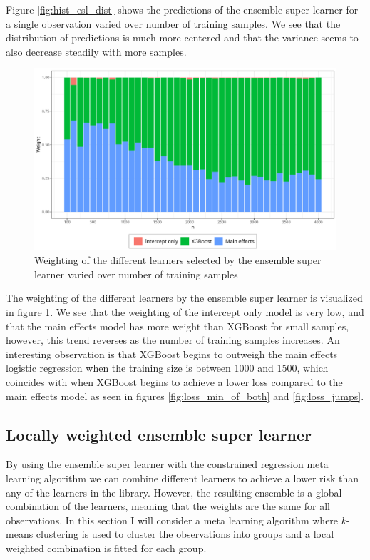 \documentclass[./main.tex]{subfiles}
\begin{document}
Figure \ref{fig:hist_esl_dist} shows the predictions of the ensemble super learner for a single observation varied over number of training samples. We see that the distribution of predictions is much more centered and that the variance seems to also decrease steadily with more samples. 
\begin{figure}[H]
    \centering
    \includegraphics[width=\textwidth]{figures/esl_weights.png}
    \caption{Weighting of the different learners selected by the ensemble super learner varied over number of training samples}
    \label{fig:esl_weights}
\end{figure}
The weighting of the different learners by the ensemble super learner is visualized in figure \ref{fig:esl_weights}. We see that the weighting of the intercept only model is very low, and that the main effects model has more weight than XGBoost for small samples, however, this trend reverses as the number of training samples increases. An interesting observation is that XGBoost begins to outweigh the main effects logistic regression when the training size is between 1000 and 1500, which coincides with when XGBoost begins to achieve a lower loss compared to the main effects model as seen in figures \ref{fig:loss_min_of_both} and \ref{fig:loss_jumps}.

\subsection{Locally weighted ensemble super learner} \label{locally_weighted_ensemble_super_learner}
By using the ensemble super learner with the constrained regression meta learning algorithm we can combine different learners to achieve a lower risk than any of the learners in the library. However, the resulting ensemble is a global combination of the learners, meaning that the weights are the same for all observations. In this section I will consider a meta learning algorithm where $ k $-means clustering is used to cluster the observations into groups and a local weighted combination is fitted for each group.
\end{document}
